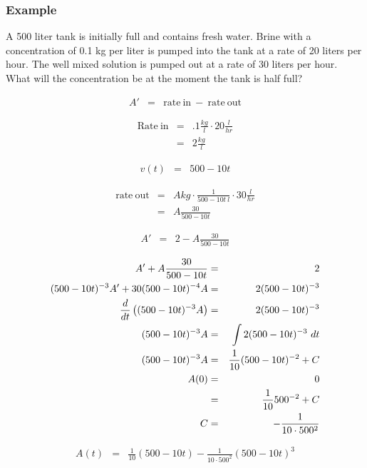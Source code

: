 \begin{frame}
  \frametitle{Example}

  {\color{red}A 500 liter tank is initially full and contains fresh water.} 
  {\color{blue}Brine with a concentration of 0.1 kg per liter is pumped into 
  the tank at a rate of 20 liters per hour.} {\color{purple}The well mixed 
  solution is pumped out at a rate of 30 liters per hour.}  
  What will the concentration be at the moment the tank is half full?

\end{frame}


\begin{frame}

  \begin{eqnarray*}
    A' & = & \mathrm{rate~in~} - \mathrm{~rate~out}
  \end{eqnarray*}

  \begin{eqnarray*}
    \mathrm{Rate~in} & = & .1 \frac{kg}{l} \cdot 20 \frac{l}{hr} \\
    & = & 2 \frac{kg}{l}
  \end{eqnarray*}

  \begin{eqnarray*}
    v(t) & = & 500-10t
  \end{eqnarray*}

  \begin{eqnarray*}
    \mathrm{rate~out} & = & A kg \cdot \frac{1}{500-10t ~ l} \cdot 30 \frac{l}{hr} \\
    & = & A \frac{30}{500-10t}
  \end{eqnarray*}

  \begin{eqnarray*}
    A' & = & 2 - A \frac{30}{500-10t}
  \end{eqnarray*}

\end{frame}


\begin{frame}

  \begin{eqnarray*}
    A' + A \frac{30}{500-10t} & = & 2 \\
    (500-10t)^{-3} A' + 30(500-10t)^{-4} A & = & 2 (500-10t)^{-3} \\
    \frac{d}{dt} \left( (500-10t)^{-3} A \right) & = & 2 (500-10t)^{-3} \\
    (500-10t)^{-3} A  & = & \int 2 (500-10t)^{-3} ~ dt  \\
    (500-10t)^{-3} A  & = & \frac{1}{10} (500-10t)^{-2} + C  \\
    A(0) & = & 0 \\
    & = & \frac{1}{10} 500^{-2} + C \\
    C & = & -\frac{1}{10\cdot500^{2}}
  \end{eqnarray*}

  \begin{eqnarray*}
    A(t) & = & \frac{1}{10} (500-10t) - \frac{1}{10\cdot500^{2}} (500-10t)^3
  \end{eqnarray*}

\end{frame}


